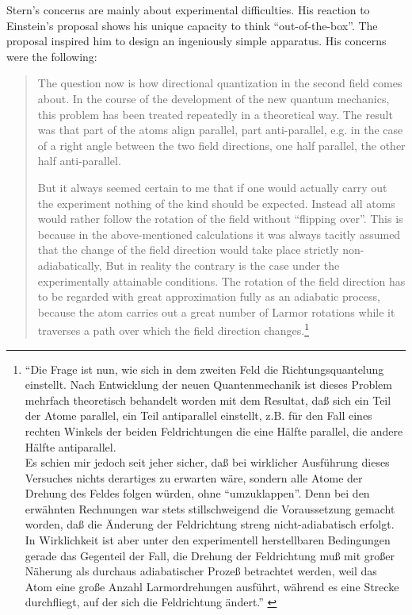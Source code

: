 \documentclass[12pt]{article}
\begin{document}
Stern's concerns are mainly about experimental difficulties. His reaction to Einstein's proposal shows his unique capacity to think  ``out-of-the-box''. The proposal inspired him to design an ingeniously simple apparatus.  His concerns were the following:
\begin{quote}
The question now is how directional quantization in the second field comes about. In the course of the development of the new quantum mechanics, this problem has been treated repeatedly in a theoretical way. The result was that part of the atoms align parallel, part anti-parallel, e.g. in the case of a right angle between the two field directions, one half parallel, the other half anti-parallel.

But it always seemed certain to me that if one would actually carry out the experiment nothing of the kind should be expected. Instead all atoms would rather follow the rotation of the field without “flipping over”. This is because in the above-mentioned calculations it was always tacitly assumed that the change of the field direction would take place strictly non-adiabatically, But in reality the contrary is the case under the experimentally attainable conditions. The rotation of the field direction has to be regarded with great approximation fully as an adiabatic process, because the atom carries out a great number of Larmor rotations while it traverses a path over which the field direction changes.\footnote{``Die Frage ist nun, wie sich in dem zweiten Feld die Richtungsquantelung einstellt. Nach Entwicklung der neuen Quantenmechanik ist dieses Problem mehrfach theoretisch behandelt worden mit dem Resultat, daß sich ein Teil der Atome parallel, ein Teil antiparallel einstellt, z.B. für den Fall eines rechten Winkels der beiden Feldrichtungen die eine Hälfte parallel, die andere Hälfte antiparallel.\\
Es schien mir jedoch seit jeher sicher, daß bei wirklicher Ausführung dieses Versuches nichts derartiges zu erwarten wäre, sondern alle Atome der Drehung des Feldes folgen würden, ohne ``umzuklappen''. Denn bei den erwähnten Rechnungen war stets stillschweigend die Voraussetzung gemacht worden, daß die Änderung der Feldrichtung streng nicht-adiabatisch erfolgt. In Wirklichkeit ist aber unter den experimentell herstellbaren Bedingungen gerade das Gegenteil der Fall, die Drehung der Feldrichtung muß mit großer Näherung als durchaus adiabatischer Prozeß betrachtet werden, weil das Atom eine große Anzahl Larmordrehungen ausführt, während es eine Strecke durchfliegt, auf der sich die Feldrichtung ändert.'' \cite[pp.~185--186]{PhippsTEtal1932Einstellung}}
\end{quote}
\end{document}
